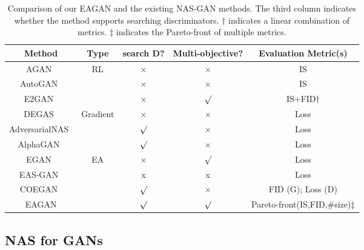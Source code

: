 \documentclass[runningheads]{llncs}
\begin{document}
\begin{table*}[!ht]
    \centering
    \scalebox{1}
    {
    \begin{tabular}{c|c|c|c|c}\hline
    Method & Type & search D? &Multi-objective? & Evaluation Metric(s)\\\hline
    
    AGAN~\cite{agan} & \multirow{3}{*}{RL} & × &×&IS\\
    AutoGAN~\cite{autoGAN} & & × & ×&IS\\
    E2GAN~\cite{offgan} & & × &$\surd$ & IS+FID$\dagger$\\\hline
    
    DEGAS~\cite{DEGAS} &  \multirow{3}{*}{Gradient} &×& ×&Loss\\
    AdversarialNAS~\cite{Adversarialnas} && $\surd$ & ×&Loss\\
    AlphaGAN~\cite{AlphaGAN} & & $\surd$& ×&Loss\\ \hline
    
    EGAN~\cite{EGAN} & \multirow{4}{*}{EA}& ×& $\surd$ & Loss \\
    EAS-GAN~\cite{EAS-GAN} & & x & x& Loss \\
    COEGAN~\cite{costa2019coevolution}& &$\surd$&×&FID (G); Loss (D)\\
    EAGAN & & $\surd$ &  $\surd$&Pareto-front(IS,FID,\#size)$\ddagger$\\\hline
    \end{tabular}
    }
    \caption{Comparison of our EAGAN and the existing NAS-GAN methods. The third column indicates whether the method supports searching discriminators. $\dagger$ indicates a linear combination of metrics. $\ddagger$ indicates the Pareto-front of multiple metrics.}
    \label{tab:NAS_GAN}
\end{table*}


\subsection{NAS for GANs}\label{sec:nas_gan}
\end{document}
